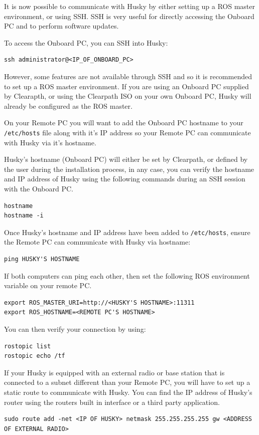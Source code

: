 \documentclass[]{clearpath-latex/clearpath-manual}
\begin{document}
It is now possible to communicate with Husky by either setting up a ROS master environment, or using SSH. SSH is very useful for directly accessing the Onboard PC and to perform software updates.

To access the Onboard PC, you can SSH into Husky:

\begin{lstlisting}
ssh administrator@<IP_OF_ONBOARD_PC>
\end{lstlisting}

However, some features are not available through SSH and so it is recommended to set up a ROS master environment.
If you are using an Onboard PC supplied by Clearapth, or using the Clearpath ISO on your own Onboard PC, Husky will
already be configured as the ROS master.

On your Remote PC you will want to add the Onboard PC hostname to your \lstinline{/etc/hosts} file along with it's IP address
so your Remote PC can communicate with Husky via it's hostname.

Husky's hostname (Onboard PC) will either be set by Clearpath, or defined by the user during the
installation process, in any case, you can verify the hostname and IP address of Husky using
the following commands during an SSH session with the Onboard  PC.

\begin{lstlisting}
hostname
hostname -i
\end{lstlisting}


Once Husky's hostname and IP address have been added to \lstinline{/etc/hosts}, ensure the Remote PC
can communicate with Husky via hostname:

\begin{lstlisting}
ping HUSKY'S HOSTNAME
\end{lstlisting}

If both computers can ping each other, then set the following ROS environment variable on your remote PC.

\begin{lstlisting}
export ROS_MASTER_URI=http://<HUSKY'S HOSTNAME>:11311
export ROS_HOSTNAME=<REMOTE PC'S HOSTNAME>
\end{lstlisting}

You can then verify your connection by using:

\begin{lstlisting}
rostopic list
rostopic echo /tf
\end{lstlisting}

If your Husky is equipped with an external radio or base station that is connected to a subnet different than your Remote PC,
you will have to set up a static route to communicate with Husky. You can find the IP address of Husky’s
router using the routers built in interface or a third party application.
\begin{lstlisting}
sudo route add -net <IP OF HUSKY> netmask 255.255.255.255 gw <ADDRESS OF EXTERNAL RADIO>
\end{lstlisting}
\end{document}
